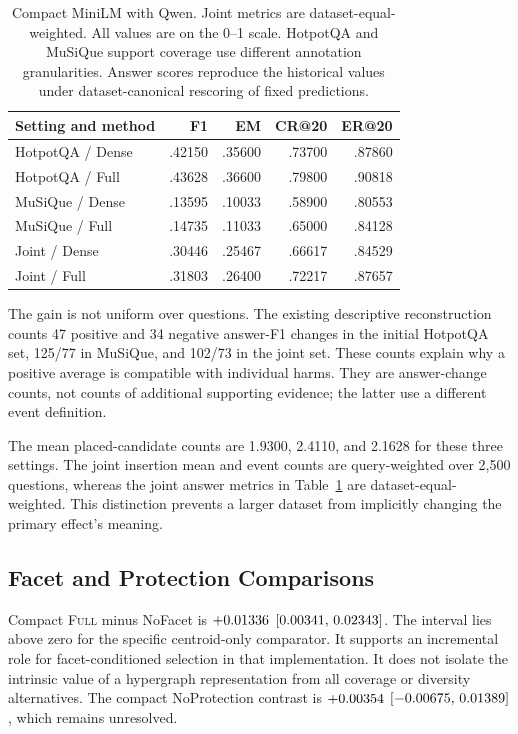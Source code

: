 \documentclass[11pt,a4paper]{article}
\newcommand{\full}{\textsc{Full}\xspace}
\begin{document}
\begin{table}[t]
\centering\small
\begin{tabular}{@{}lrrrr@{}}
\toprule
Setting and method & F1 & EM & CR@20 & ER@20\\
\midrule
HotpotQA / Dense & .42150 & .35600 & .73700 & .87860\\
HotpotQA / Full & .43628 & .36600 & .79800 & .90818\\
MuSiQue / Dense & .13595 & .10033 & .58900 & .80553\\
MuSiQue / Full & .14735 & .11033 & .65000 & .84128\\
Joint / Dense & .30446 & .25467 & .66617 & .84529\\
Joint / Full & .31803 & .26400 & .72217 & .87657\\
\bottomrule
\end{tabular}
\caption{Compact MiniLM with Qwen. Joint metrics are dataset-equal-weighted.
All values are on the 0--1 scale. HotpotQA and MuSiQue support coverage use
different annotation granularities. Answer scores reproduce the historical
values under dataset-canonical rescoring of fixed predictions.}
\label{tab:compact}
\end{table}

The gain is not uniform over questions. The existing descriptive
reconstruction counts 47 positive and 34 negative answer-F1 changes in the
initial HotpotQA set, 125/77 in MuSiQue, and 102/73 in the joint set.
These counts explain why a positive average is compatible with individual
harms. They are answer-change counts, not counts of additional supporting
evidence; the latter use a different event definition.

The mean placed-candidate counts are 1.9300, 2.4110, and 2.1628 for these
three settings. The joint insertion mean and event counts are query-weighted
over 2,500 questions, whereas the joint answer metrics in
Table~\ref{tab:compact} are dataset-equal-weighted.
This distinction prevents a larger dataset from implicitly changing the
primary effect's meaning.

\subsection{Facet and Protection Comparisons}
Compact \full minus NoFacet is $+0.01336$ $[0.00341,\,0.02343]$.
The interval lies above zero for the specific centroid-only comparator.
It supports an incremental role for facet-conditioned selection in that
implementation. It does not isolate the intrinsic value of a hypergraph
representation from all coverage or diversity alternatives.
The compact NoProtection contrast is $+0.00354$ $[-0.00675,\,0.01389]$,
which remains unresolved.
\end{document}
